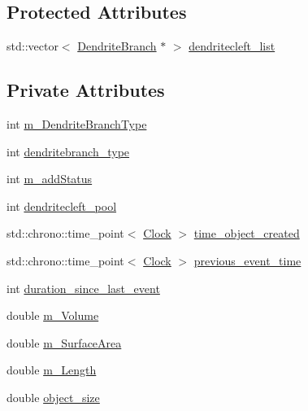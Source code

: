 \subsection*{Protected Attributes}
\begin{DoxyCompactItemize}
\item 
std\+::vector$<$ \mbox{\hyperlink{classDendriteBranch}{Dendrite\+Branch}} $\ast$ $>$ \mbox{\hyperlink{classDendriteBranch_a8015119958f7581d826dcac2c21919c9}{dendritecleft\+\_\+list}}
\end{DoxyCompactItemize}
\subsection*{Private Attributes}
\begin{DoxyCompactItemize}
\item 
int \mbox{\hyperlink{classDendriteBranch_a9d7e5a41efbacc5bb7445a978191c2ca}{m\+\_\+\+Dendrite\+Branch\+Type}}
\item 
int \mbox{\hyperlink{classDendriteBranch_a44ed56dc44bea543b97a6924024edaa8}{dendritebranch\+\_\+type}}
\item 
int \mbox{\hyperlink{classDendriteBranch_a14ca1ae99be78c8dbfea00ec0688ec3d}{m\+\_\+add\+Status}}
\item 
int \mbox{\hyperlink{classDendriteBranch_a27d706db3dbe49fea1a33e835036be43}{dendritecleft\+\_\+pool}}
\item 
std\+::chrono\+::time\+\_\+point$<$ \mbox{\hyperlink{universe_8h_a0ef8d951d1ca5ab3cfaf7ab4c7a6fd80}{Clock}} $>$ \mbox{\hyperlink{classDendriteBranch_a253b94811cb4a0697446dc3d572f91de}{time\+\_\+object\+\_\+created}}
\item 
std\+::chrono\+::time\+\_\+point$<$ \mbox{\hyperlink{universe_8h_a0ef8d951d1ca5ab3cfaf7ab4c7a6fd80}{Clock}} $>$ \mbox{\hyperlink{classDendriteBranch_a16bdc976d615cf2b1b5e3238241e19b6}{previous\+\_\+event\+\_\+time}}
\item 
int \mbox{\hyperlink{classDendriteBranch_a534b56c182fe5f07f012b452c22e59e9}{duration\+\_\+since\+\_\+last\+\_\+event}}
\item 
double \mbox{\hyperlink{classDendriteBranch_a06c7e10791bfbafa1f32ff5cc52e689e}{m\+\_\+\+Volume}}
\item 
double \mbox{\hyperlink{classDendriteBranch_ad7296b522c39f3dae64caf75733e7744}{m\+\_\+\+Surface\+Area}}
\item 
double \mbox{\hyperlink{classDendriteBranch_a87bfabc1ab5a0e066085130808b11c30}{m\+\_\+\+Length}}
\item 
double \mbox{\hyperlink{classDendriteBranch_a19c3bd5c518cf8b4fdae49586ad0df4b}{object\+\_\+size}}

\end{DoxyCompactItemize}
